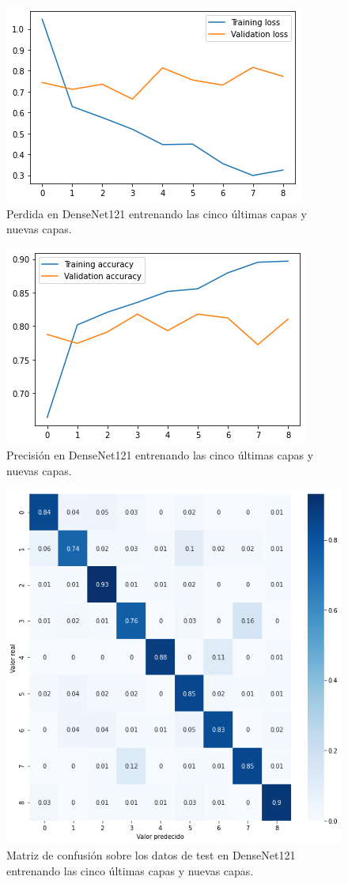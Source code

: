 \begin{figure}[H]
  \centering
  \includegraphics[width=0.5\linewidth]{Imagenes/entrenamiento_redes/5-ult/densenet_5ult_loss.png}
  \caption{Perdida en DenseNet121 entrenando las cinco últimas capas y nuevas capas.}
\end{figure}

\begin{figure}[H]
  \centering
  \includegraphics[width=0.5\linewidth]{Imagenes/entrenamiento_redes/5-ult/densenet_5ult_acc.png}
  \caption{Precisión en DenseNet121 entrenando las cinco últimas capas y nuevas capas.}
\end{figure}

\begin{figure}[H]
  \centering
  \includegraphics[width=0.5\linewidth]{Imagenes/entrenamiento_redes/5-ult/densenet_5ult_matriz.png}
  \caption{Matriz de confusión sobre los datos de test en DenseNet121 entrenando las cinco últimas capas y nuevas capas.}
\end{figure}


